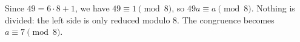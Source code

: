 Since $49=6\cdot8+1$, we have $49\equiv1\pmod8$, so $49a\equiv a\pmod8$. Nothing is divided: the left side is only reduced modulo $8$. The congruence becomes $a\equiv\boxed{7}\pmod8$.
